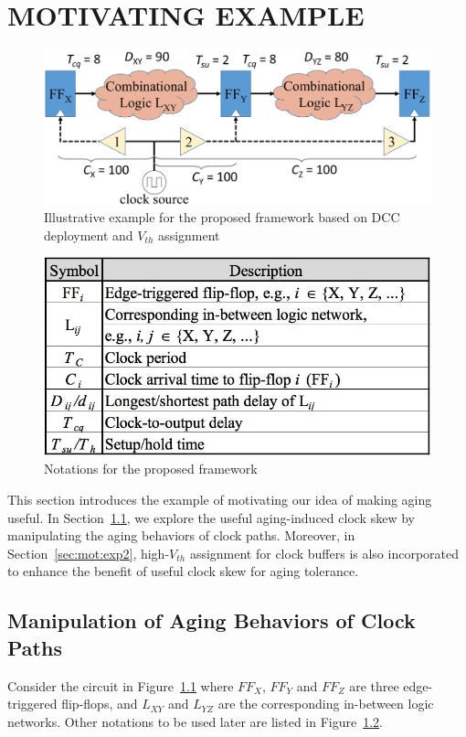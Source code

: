 \chapter{MOTIVATING EXAMPLE}
\label{sec:motivate}
\begin{figure}[!htbp]
    \centering
    \includegraphics[width=1\columnwidth]{images/Motivating_example.png} 
    \caption{Illustrative example for the proposed framework based on DCC deployment and $V_{th}$ assignment}
    \label{fig:sub:example}
\end{figure}
\begin{figure}[!htbp]
    \centering
    \includegraphics[width=0.7\columnwidth]{images/Notations.png}
    \caption{Notations for the proposed framework}
    \label{fig:sub:notations}
\end{figure}


This section introduces the example of motivating our idea of making aging useful. In Section~\ref{sec:mot:exp1}, we explore the useful aging-induced clock skew by manipulating the aging behaviors of clock paths. Moreover, in Section~\ref{sec:mot:exp2}, high-$V_{th}$ assignment for clock buffers is also incorporated to enhance the benefit of useful clock skew for aging tolerance. 

\section{Manipulation of Aging Behaviors of Clock Paths}
\label{sec:mot:exp1}
Consider the circuit in Figure~\ref{fig:sub:example} where ${FF}_{X}$, ${FF}_{Y}$ and ${FF}_{Z}$ are three edge-triggered flip-flops, and ${L}_{XY}$ and ${L}_{YZ}$ are the corresponding in-between logic networks. Other notations to be used later are listed in Figure~\ref{fig:sub:notations}.

